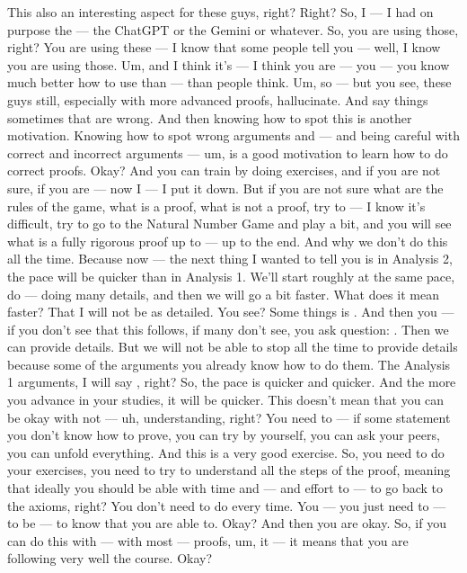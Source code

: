 \begin{spoken-clean}[00:04:08 - 00:08:20]
This also an interesting aspect for these guys, right?  Right? So, I --- I had on purpose the --- the ChatGPT or the Gemini or whatever. So, you are using those, right? You are using these --- I know that some people tell you  --- well, I know you are using those. Um, and I think it's --- I think you are --- you --- you know much better how to use than --- than people think. Um, so --- but you see, these guys still, especially with more advanced proofs, hallucinate. And say things sometimes that are wrong. And then knowing how to spot this is another motivation. Knowing how to spot wrong arguments and --- and being careful with correct and incorrect arguments --- um, is a good motivation to learn how to do correct proofs. Okay? And you can train by doing exercises, and if you are not sure, if you are --- now I --- I put it down. But if you are not sure what are the rules of the game, what is a proof, what is not a proof, try to --- I know it's difficult, try to go to the Natural Number Game and play a bit, and you will see what is a fully rigorous proof up to --- up to the end. And why we don't do this all the time. Because now --- the next thing I wanted to tell you is in Analysis 2, the pace will be quicker than in Analysis 1. We'll start roughly at the same pace, do --- doing many details, and then we will go a bit faster. What does it mean faster? That I will not be as detailed. You see? Some things is . And then you --- if you don't see that this follows, if many don't see, you ask question: . Then we can provide details. But we will not be able to stop all the time to provide details because some of the arguments you already know how to do them. The Analysis 1 arguments, I will say , right? So, the pace is quicker and quicker. And the more you advance in your studies, it will be quicker. This doesn't mean that you can be okay with not --- uh, understanding, right? You need to --- if some statement you don't know how to prove, you can try by yourself, you can ask your peers, you can unfold everything. And this is a very good exercise. So, you need to do your exercises, you need to try to understand all the steps of the proof, meaning that ideally you should be able with time and --- and effort to --- to go back to the axioms, right? You don't need to do every time. You --- you just need to --- to be --- to know that you are able to. Okay? And then you are okay. So, if you can do this with --- with most --- proofs, um, it --- it means that you are following very well the course. Okay?
\end{spoken-clean}


